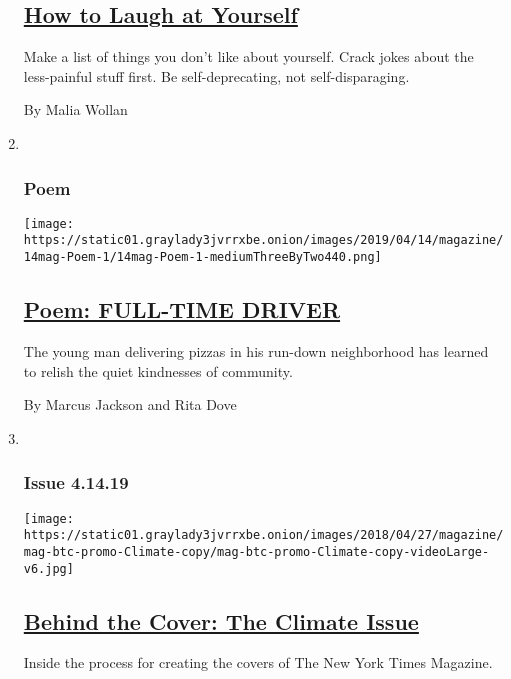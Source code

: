 \begin{enumerate}
  \hypertarget{how-to-laugh-at-yourself}{%
  \subsection{\texorpdfstring{\href{/2019/04/09/magazine/how-to-laugh-at-yourself.html}{How
  to Laugh at
  Yourself}}{How to Laugh at Yourself}}\label{how-to-laugh-at-yourself}}

  Make a list of things you don't like about yourself. Crack jokes about
  the less-painful stuff first. Be self-deprecating, not
  self-disparaging.

  By Malia Wollan
\item ~
  \hypertarget{poem}{%
  \subsubsection{Poem}\label{poem}}

  \texttt{[image: https://static01.graylady3jvrrxbe.onion/images/2019/04/14/magazine/14mag-Poem-1/14mag-Poem-1-mediumThreeByTwo440.png]}

  \hypertarget{poem-full-time-driver}{%
  \subsection{\texorpdfstring{\href{/2019/04/12/magazine/poem-full-time-driver.html}{Poem:
  FULL-TIME
  DRIVER}}{Poem: FULL-TIME DRIVER}}\label{poem-full-time-driver}}

  The young man delivering pizzas in his run-down neighborhood has
  learned to relish the quiet kindnesses of community.

  By Marcus Jackson and Rita Dove
\item ~
  \hypertarget{issue-41419}{%
  \subsubsection{Issue 4.14.19}\label{issue-41419}}

  \texttt{[image: https://static01.graylady3jvrrxbe.onion/images/2018/04/27/magazine/mag-btc-promo-Climate-copy/mag-btc-promo-Climate-copy-videoLarge-v6.jpg]}

  \hypertarget{behind-the-cover-the-climate-issue}{%
  \subsection{\texorpdfstring{\href{/2019/04/12/magazine/behind-the-cover-the-climate-issue.html}{Behind
  the Cover: The Climate
  Issue}}{Behind the Cover: The Climate Issue}}\label{behind-the-cover-the-climate-issue}}

  Inside the process for creating the covers of The New York Times
  Magazine.
\end{enumerate}

